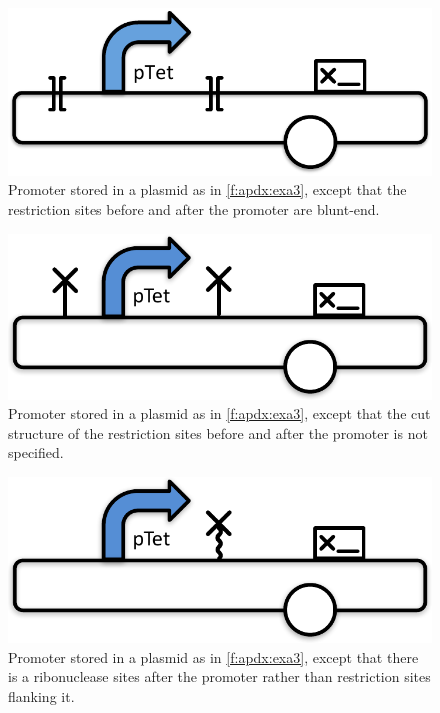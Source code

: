 \begin{figure}[h!]
\includegraphics[scale=0.5]{figures/apdx-examples/apdx-exa4.pdf}
\caption{Promoter stored in a plasmid as in \ref{f:apdx:exa3}, except that the restriction sites before and after the promoter are blunt-end.}
\label{f:apdx:exa4}
\end{figure}

\begin{figure}[h!]
\includegraphics[scale=0.5]{figures/apdx-examples/apdx-exa5.pdf}
\caption{Promoter stored in a plasmid as in \ref{f:apdx:exa3}, except that the cut structure of the restriction sites before and after the promoter is not specified.}
\label{f:apdx:exa5}
\end{figure}

\begin{figure}[h!]
\includegraphics[scale=0.5]{figures/apdx-examples/apdx-exa6.pdf}
\caption{Promoter stored in a plasmid as in \ref{f:apdx:exa3}, except that there is a ribonuclease sites after the promoter rather than restriction sites flanking it.}
\label{f:apdx:exa6}
\end{figure}

